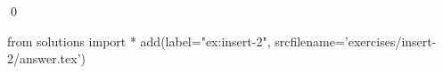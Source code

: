 
\begin{ex} 
  \label{ex:insert-2}
  
  \qed
\end{ex} 
\begin{python0}
from solutions import *
add(label="ex:insert-2",
    srcfilename='exercises/insert-2/answer.tex') 
\end{python0}
